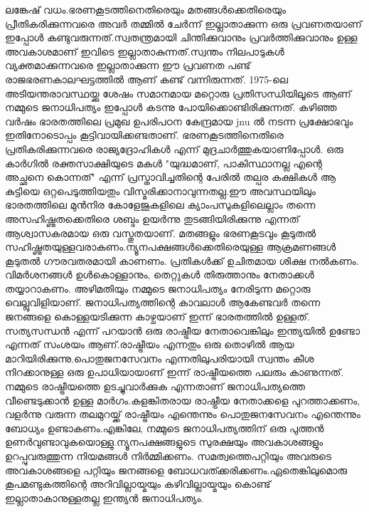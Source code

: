 \documentclass[10pt,a4paper]{report}
\begin{document}
ലങ്കേഷ് വധം.ഭരണകൂടത്തിനെതിരെയും മതങ്ങൾക്കെതിരെയും പ്രീതികരിക്കുന്നവരെ അവർ തമ്മിൽ ചേർന്ന് ഇല്ലാതാക്കുന്ന ഒരു പ്രവണതയാണ് ഇപ്പോൾ കണ്ടുവരുന്നത്.സ്വതന്ത്രമായി ചിന്തിക്കുവാനും പ്രവർത്തിക്കുവാനും ഉള്ള അവകാശമാണ് ഇവിടെ ഇല്ലാതാകുന്നത്.സ്വന്തം നിലപാടുകൾ വ്യക്തമാക്കുന്നവരെ ഇല്ലാതാക്കുന്ന ഈ പ്രവണത പണ്ട് രാജഭരണകാലഘട്ടത്തിൽ ആണ് കണ്ട് വന്നിരുന്നത്. 1975-ലെ അടിയന്തരാവസ്ഥയ്ക്കു ശേഷം സമാനമായ മറ്റൊരു പ്രതിസന്ധിയിലൂടെ ആണ് നമ്മുടെ ജനാധിപത്യം ഇപ്പോൾ കടന്നു പോയിക്കൊണ്ടിരിക്കുന്നത്. കഴിഞ്ഞ വർഷം ഭാരതത്തിലെ പ്രമുഖ ഉപരിപഠന കേന്ദ്രമായ jnu ൽ നടന്ന പ്രക്ഷോഭവും ഇതിനോടൊപ്പം കൂട്ടിവായിക്കണ്ടതാണ്. ഭരണകൂടത്തിനെതിരെ പ്രതികരിക്കുന്നവരെ രാജ്യദ്രോഹികൾ എന്ന് മുദ്രചാർത്തുകയാണിപ്പോൾ. ഒരു കാർഗിൽ രക്തസാക്ഷിയുടെ മകൾ "യുദ്ധമാണ്, പാകിസ്ഥാനല്ല എന്റെ അച്ഛനെ കൊന്നത്" എന്ന് പ്രസ്താവിച്ചതിന്റെ പേരിൽ തല്പര കക്ഷികൾ ആ കുട്ടിയെ ഒറ്റപെടുത്തിയതും വിസ്മരിക്കാനാവുന്നതല്ല.ഈ അവസ്ഥയിലും ഭാരതത്തിലെ മുൻനിര കോളേജുകളിലെ ക്യാംപസുകളിലെല്ലാം തന്നെ അസഹിഷ്ണുതക്കെതിരെ ശബ്ദം ഉയർന്നു തുടങ്ങിയിരിക്കുന്നു എന്നത് ആശ്വാസകരമായ ഒരു വസ്തുതയാണ്. മതങ്ങളും ഭരണകൂടവും കൂടുതൽ സഹിഷ്ണുതയുള്ളവരാകണം.ന്യൂനപക്ഷങ്ങൾക്കെതിരെയുള്ള ആക്രമണങ്ങൾ കൂടുതൽ ഗൗരവതരമായി കാണണം. പ്രതികൾക്ക് ഉചിതമായ ശിക്ഷ നൽകണം. വിമർശനങ്ങൾ ഉൾകൊള്ളാനും, തെറ്റുകൾ തിരുത്താനും നേതാക്കൾ തയ്യാറാകണം. അഴിമതിയും നമ്മുടെ ജനാധിപത്യം നേരിടുന്ന മറ്റൊരു വെല്ലുവിളിയാണ്. ജനാധിപത്യത്തിന്റെ കാവലാൾ ആകേണ്ടവർ തന്നെ ജനങ്ങളെ കൊള്ളയടിക്കുന്ന കാഴ്ചയാണ് ഇന്ന് ഭാരതത്തിൽ ഉള്ളത്. സത്യസന്ധൻ എന്ന് പറയാൻ ഒരു രാഷ്ട്രീയ നേതാവെങ്കിലും ഇന്ത്യയിൽ ഉണ്ടോ എന്നത് സംശയം ആണ്.രാഷ്ട്രീയം എന്നതും ഒരു തൊഴിൽ ആയ മാറിയിരിക്കുന്നു.പൊതുജനസേവനം എന്നതിലുപരിയായി സ്വന്തം കീശ നിറക്കാനുള്ള ഒരു ഉപാധിയായാണ് ഇന്ന് രാഷ്ട്രീയത്തെ പലരും കാണുന്നത്. നമ്മുടെ രാഷ്ട്രീയത്തെ ഉടച്ചുവാർക്കുക എന്നതാണ് ജനാധിപത്യത്തെ വീണ്ടെടുക്കാൻ ഉള്ള മാർഗം.കളങ്കിതരായ രാഷ്ട്രീയ നേതാക്കളെ പുറത്താക്കണം, വളർന്നു വരുന്ന തലമുറയ്ക്ക് രാഷ്ട്രീയം എന്തെന്നും പൊതുജനസേവനം എന്തെന്നും ബോധ്യം ഉണ്ടാകണം.എങ്കിലേ, നമ്മുടെ ജനാധിപത്യത്തിന് ഒരു പുത്തൻ ഉണർവുണ്ടാവുകയൊള്ളു.ന്യൂനപക്ഷങ്ങളുടെ സുരക്ഷയും അവകാശങ്ങളും ഉറപ്പുവരുത്തുന്ന നിയമങ്ങൾ നിർമ്മിക്കണം. സമത്വത്തെപറ്റിയും അവരുടെ അവകാശങ്ങളെ പറ്റിയും ജനങ്ങളെ ബോധവത്ക്കരിക്കണം.ഏതെങ്കിലുമൊരു കൂപമണ്ടുകത്തിന്റെ അറിവില്ലായ്മയും കഴിവില്ലായ്മയും കൊണ്ട് ഇല്ലാതാകാനുള്ളതല്ല ഇന്ത്യൻ ജനാധിപത്യം.
\end{document}
